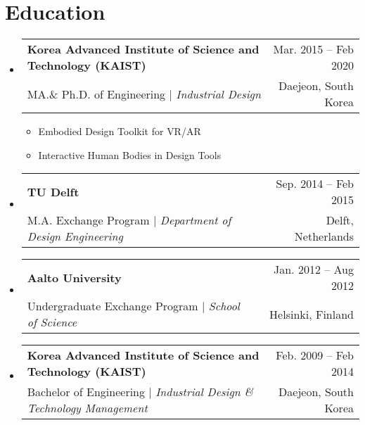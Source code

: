 \documentclass[letterpaper,11pt]{article} %
\makeatletter
\newcommand{\CVItem}[1]{
  \item\small{
    {#1 \vspace{-2pt}}
  }
}
\newcommand{\CVSubheading}[4]{
  \vspace{-2pt}\item
    \begin{tabular*}{0.97\textwidth}[t]{l@{\extracolsep{\fill}}r}
      \textbf{#1} & #2 \\
      \small#3 & \small #4 \\
    \end{tabular*}\vspace{-7pt}
}
\newcommand{\CVSubHeadingListStart}{\begin{itemize}[leftmargin=0.5cm, label={}]}
\newcommand{\CVSubHeadingListEnd}{\end{itemize}}
\newcommand{\CVItemListStart}{\begin{itemize}}
\newcommand{\CVItemListEnd}{\end{itemize}\vspace{-5pt}}
\makeatother
\begin{document}
\begin{comment}
This CV was written for specifically for positions I was applying for in
academia, and then modified to be a template.

A standard CV is about two pages long where as a resume in the US is one page.
sections can be added and removed here with this in mind. In my experience, 
education, and applicable work experience and skills are the most import things
to include on a resume. For a CV the Europass CV suggests the categories: Work
Experience, Education and Training, Language Skills, Digital Skills,
Communication and Interpersonal Skills, Conferences and Seminars, Creative Works
Driver's License, Hobbies and Interests, Honors and Awards, Management and
Leadership Skills, Networks and Memberships, Organizational Skills, Projects,
Publications, Recommendations, Social and Political Activities, Volunteering.

Your goal is to convey a who, what , when, where, why for every item you share. 
The who is obviously you, but I believe the rest should be done in that order.
For example below. An employer cares most about the degree held and typically 
less about the institution or where it is located (This is still good 
information though). Whatever order you choose be consistent throughout.
\end{comment}

\section{Education}
  \CVSubHeadingListStart
    \CVSubheading
      {{Korea Advanced Institute of Science and Technology (KAIST)}}{Mar. 2015 -- Feb 2020}
      {MA.\& Ph.D. of Engineering $|$ \emph{\small{Industrial Design}}}{Daejeon, South Korea}
      \CVItemListStart
        \CVItem{Embodied Design Toolkit for VR/AR}
        \CVItem{Interactive Human Bodies in Design Tools}
      \CVItemListEnd
    \CVSubheading
      {{TU Delft}}{Sep. 2014 -- Feb 2015}
      {M.A. Exchange Program $|$ \emph{\small{Department of Design Engineering}}}{Delft, Netherlands}
    \CVSubheading
      {{Aalto University}}{Jan. 2012 -- Aug 2012}
      {Undergraduate Exchange Program $|$ \emph{\small{School of Science}}}{Helsinki, Finland}
    \CVSubheading
      {Korea Advanced Institute of Science and Technology (KAIST)}{Feb. 2009 -- Feb 2014}
      {Bachelor of Engineering $|$ \emph{\small{Industrial Design \& Technology Management}}}{Daejeon, South Korea}
  \CVSubHeadingListEnd
\end{document}
